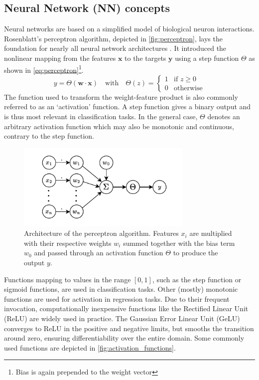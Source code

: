 \subsection{Neural Network (NN) concepts}
\label{subsec:nn_concepts}
Neural networks are based on a simplified model of biological neuron interactions. Rosenblatt's perceptron algorithm, depicted in \autoref{fig:perceptron}, lays the foundation for nearly all neural network architectures \parencite{ref:rosenblatt1958perceptron}. It introduced the nonlinear mapping from the features $\mathbf{x}$ to the targets $\mathbf{y}$ using a step function $\Theta$ as shown in \autoref{eq:perceptron}\footnote{Bias is again prepended to the weight vector}.
\begin{equation}
    \label{eq:perceptron}
    y = \Theta(\mathbf{w} \cdot \mathbf{x}) \quad \text{with} \quad
    \Theta(z) =
    \begin{cases}
        1 & \text{if } z \geq 0 \\
        0 & \text{otherwise}
    \end{cases}
\end{equation}
The function used to transform the weight-feature product is also commonly referred to as an `activation' function. A step function gives a binary output and is thus most relevant in classification tasks. In the general case, $\Theta$ denotes an arbitrary activation function which may also be monotonic and continuous, contrary to the step function.\\
\begin{figure}[H]
    \centering
    \includegraphics[width=0.75\textwidth]{../fig/background/Perceptron.pdf}
    \caption[Perceptron]{Architecture of the perceptron algorithm. Features $x_i$ are multiplied with their respective weights $w_i$ summed together with the bias term $w_0$ and passed through an activation function $\Theta$ to produce the output $y$.}
    \label{fig:perceptron}
\end{figure}
Functions mapping to values in the range $[0, 1]$, such as the step function or sigmoid functions, are used in classification tasks. Other (mostly) monotonic functions are used for activation in regression tasks. Due to their frequent invocation, computationally inexpensive functions like the Rectified Linear Unit (ReLU) are widely used in practice. The Gaussian Error Linear Unit (GeLU) converges to ReLU in the positive and negative limits, but smooths the transition around zero, ensuring differentiability over the entire domain. Some commonly used functions are depicted in \autoref{fig:activation_functions}. 
